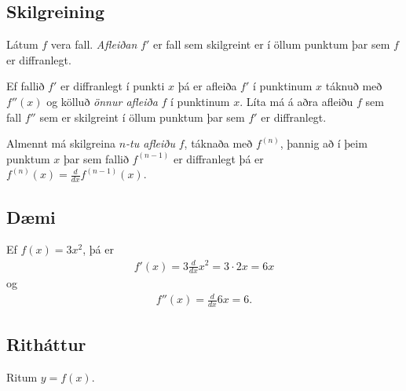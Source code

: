 \documentclass[b5paper,11pt,icelandic]{sphinxmanual}
\begin{document}
\subsection{Skilgreining}
\label{kafli03:skilgreining}
Látum \(f\) vera fall. \emph{Afleiðan} \(f'\) er fall sem skilgreint er
í öllum punktum þar sem \(f\) er diffranlegt.

Ef fallið \(f'\) er diffranlegt í punkti \(x\) þá er afleiða
\(f'\) í punktinum \(x\) táknuð með \(f''(x)\) og kölluð
\textit{önnur afleiða} \(f\) í punktinum \(x\). Líta má á aðra afleiðu
\(f\) sem fall \(f''\) sem er skilgreint í öllum punktum þar sem
\(f'\) er diffranlegt.

Almennt má skilgreina \(n\)\emph{-tu afleiðu} \(f\), táknaða með
\(f^{(n)}\), þannig að í þeim punktum \(x\) þar sem fallið
\(f^{(n-1)}\) er diffranlegt þá er
\(f^{(n)}(x)=\frac{d}{dx}f^{(n-1)}(x)\).


\subsection{Dæmi}
\label{kafli03:id8}
Ef \(f(x)  = 3x^2\), þá er
\begin{equation*}
\begin{split}f'(x) = 3\frac{d}{dx}x^2 = 3\cdot 2x = 6x\end{split}
\end{equation*}
og
\begin{equation*}
\begin{split}f''(x) = \frac{d}{dx} 6x = 6.\end{split}
\end{equation*}

\subsection{Ritháttur}
\label{kafli03:id9}
Ritum \(y=f(x)\).
\end{document}

